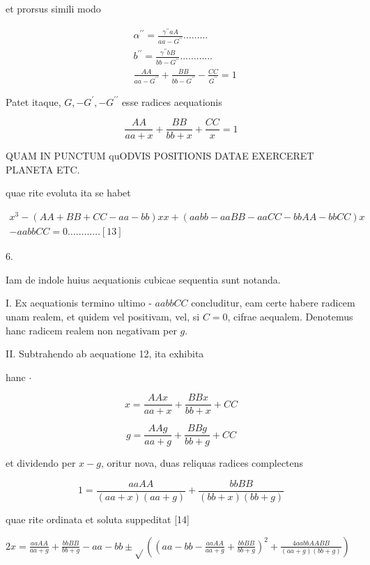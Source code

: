 \documentclass[10pt]{article}
\begin{document}
et prorsus simili modo

\[
\begin{aligned}
& \alpha^{\prime \prime}=\frac{\gamma^{\prime \prime} a A}{a a-G^{\prime \prime}} \ldots \ldots \ldots \\
& b^{\prime \prime}=\frac{\gamma^{\prime \prime} b B}{b b-G^{\prime \prime}} \ldots \ldots \ldots \ldots \\
& \frac{A A}{a a-G^{\prime \prime}}+\frac{B B}{b b-G^{\prime \prime}}-\frac{C C}{G^{\prime \prime}}=1
\end{aligned}
\]

Patet itaque, \(G,-G^{\prime},-G^{\prime \prime}\) esse radices aequationis

\[
\frac{A A}{a a+x}+\frac{B B}{b b+x}+\frac{C C}{x}=1
\]

QUAM IN PUNCTUM quODVIS POSITIONIS DATAE EXERCERET PLANETA ETC.

quae rite evoluta ita se habet

\[
\begin{gathered}
x^{3}-(A A+B B+C C-a a-b b) x x+(a a b b-a a B B-a a C C-b b A A-b b C C) x \\
-a a b b C C=0 \ldots \ldots \ldots \ldots[13]
\end{gathered}
\]

6.

Iam de indole huius aequationis cubicae sequentia sunt notanda.

I. Ex aequationis termino ultimo - \(a a b b C C\) concluditur, eam certe habere radicem unam realem, et quidem vel positivam, vel, si \(C=0\), cifrae aequalem. Denotemus hanc radicem realem non negativam per \(g\).

II. Subtrahendo ab aequatione 12, ita exhibita

hanc \(\cdot\)

\[
x=\frac{A A x}{a a+x}+\frac{B B x}{b b+x}+C C
\]

\[
g=\frac{A A g}{a a+g}+\frac{B B g}{b b+g}+C C
\]

et dividendo per \(x-g\), oritur nova, duas reliquas radices complectens

\[
1=\frac{a a A A}{(a a+x)(a a+g)}+\frac{b b B B}{(b b+x)(b b+g)}
\]

quae rite ordinata et soluta suppeditat [14]

\(2 x=\frac{a a A A}{a a+g}+\frac{b b B B}{b b+g}-a a-b b \pm \sqrt{ }\left(\left(a a-b b-\frac{a a A A}{a a+g}+\frac{b b B B}{b b+g}\right)^{2}+\frac{4 a a b b A A B B}{(a a+g)(b b+g)}\right)\)
\end{document}
